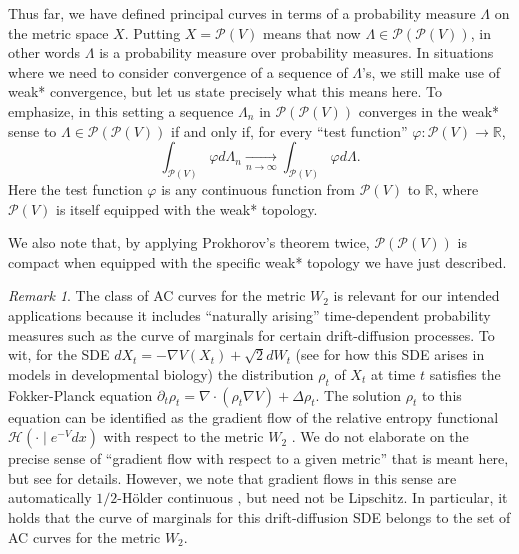\documentclass[aos, preprint]{imsart}
\theoremstyle{plain}
\theoremstyle{remark}
\newtheorem{rem}[example]{Remark}
\begin{document}
{Thus far, we have defined principal curves in terms of a probability
measure $\Lambda$ on the metric space $X$. Putting $X=\mathcal{P}(V)$
means that now $\Lambda\in\mathcal{P}(\mathcal{P}(V))$, in other words
$\Lambda$ is a probability measure over probability measures. In
situations where we need to consider convergence of a sequence of
$\Lambda$'s, we still make use of weak* convergence, but let us state
precisely what this means here. To emphasize, in this setting a
sequence $\Lambda_n$ in $\mathcal{P}(\mathcal{P}(V))$ converges in the
weak* sense to $\Lambda\in\mathcal{P}(\mathcal{P}(V))$ if and only if,
for every ``test function'' $\varphi:\mathcal{P}(V)\rightarrow \mathbb{R}$,
$$\int_{\mathcal{P}(V)}\varphi d\Lambda_n \underset{n\rightarrow\infty}{\longrightarrow}\int_{\mathcal{P}(V)}\varphi d\Lambda.$$
Here the test function $\varphi$ is any continuous function from $\mathcal{P}(V)$ to $\mathbb{R}$, where $\mathcal{P}(V)$ is itself equipped with the weak* topology.

We also note that, by applying Prokhorov's theorem twice, $\mathcal{P}(\mathcal{P}(V))$ is compact when equipped with the specific weak* topology we have just described.

\begin{rem}
The class of AC curves for the metric $W_2$ is relevant for our
intended applications because it includes ``naturally arising''
time-dependent probability measures such as the curve of marginals for
certain drift-diffusion processes. To wit, for the SDE $dX_t = -\nabla
V(X_t) + \sqrt{2}dW_t$ (see \cite{schiebinger2019optimal} for how this
SDE arises in models in developmental biology) the distribution
$\rho_t$ of $X_t$ at time $t$ satisfies the Fokker-Planck equation
$\partial_t \rho_t =  \nabla \cdot (\rho_t \nabla V) +  \Delta
\rho_t$. The solution $\rho_t$ to this equation can be identified as
the gradient flow of the relative entropy functional
$\mathcal{H}(\cdot \mid e^{-V}dx)$ with respect to the metric $W_2$
\cite{jordan1998variational}. We do not elaborate on the precise sense
of ``gradient flow with respect to a given metric'' that is meant here, but see \cite{ambrosio2008gradient,ambrosio2013user, santambrogio2017euclidean} for details. However, we note that gradient flows in this sense are automatically $1/2$-H\"{o}lder continuous \cite{santambrogio2017euclidean}, but need not be Lipschitz. In particular, it holds that the curve of marginals for this drift-diffusion SDE belongs to the set of AC curves for the metric $W_2$.
\end{rem}

}
\end{document}
